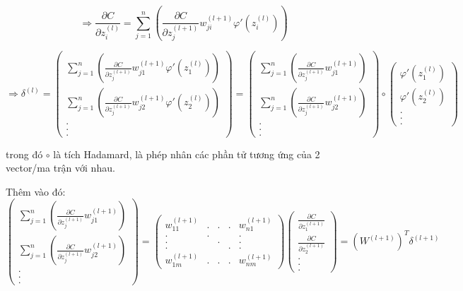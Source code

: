 \documentclass{article}
\begin{document}
\[\Rightarrow \frac{\partial{C}}{\partial{z^{(l)}_{i}}} = \sum_{j=1}^{n}(\frac{\partial{C}}{\partial{z^{(l+1)}_{j}}}w_{ji}^{(l+1)}\varphi'{(z_{i}^{(l)})})\]

\[\Rightarrow \delta^{(l)} = \begin{pmatrix} \sum_{j=1}^{n}(\frac{\partial{C}}{\partial{z^{(l+1)}_{j}}}w_{j1}^{(l+1)}\varphi'{(z_{1}^{(l)})})\\\sum_{j=1}^{n}(\frac{\partial{C}}{\partial{z^{(l+1)}_{j}}}w_{j2}^{(l+1)}\varphi'{(z_{2}^{(l)})})\\.\\.\\. \end{pmatrix} = \begin{pmatrix} \sum_{j=1}^{n}(\frac{\partial{C}}{\partial{z^{(l+1)}_{j}}}w_{j1}^{(l+1)})\\\sum_{j=1}^{n}(\frac{\partial{C}}{\partial{z^{(l+1)}_{j}}}w_{j2}^{(l+1)})\\.\\.\\. \end{pmatrix} \circ \begin{pmatrix}\varphi'{(z_{1}^{(l)})}\\\varphi'{(z_{2}^{(l)})}\\.\\.\\. \end{pmatrix}\]

trong đó $\circ$ là tích Hadamard, là phép nhân các phần tử tương ứng của 2 vector/ma trận với nhau.

Thêm vào đó: 
\[\begin{pmatrix} \sum_{j=1}^{n}(\frac{\partial{C}}{\partial{z^{(l+1)}_{j}}}w_{j1}^{(l+1)})\\\sum_{j=1}^{n}(\frac{\partial{C}}{\partial{z^{(l+1)}_{j}}}w_{j2}^{(l+1)})\\.\\.\\. \end{pmatrix}= \begin{pmatrix}w^{(l+1)}_{11}&.&.&.&w^{(l+1)}_{n1}\\.&.&&&.\\.&&.&&.\\.&&&.&.\\w^{(l+1)}_{1m}&.&.&.&w^{(l+1)}_{nm} \end{pmatrix} \begin{pmatrix} \frac{\partial{C}}{\partial{z^{(l+1)}_{1}}}\\\frac{\partial{C}}{\partial{z^{(l+1)}_{2}}}\\.\\.\\. \end{pmatrix}=(W^{(l+1)})^{T}\delta^{(l+1)}\]
\end{document}
